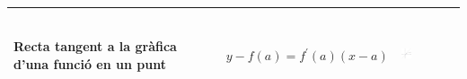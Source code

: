 \documentclass{article}
\begin{document}
\begin{center}
\begin{longtable}{ | l |l|l|}
        \hline
    Recta tangent a la gràfica d'una funció en un punt& $y-f(a)=f^{\prime}(a)(x-a)$& \includegraphics[width=0.2\textwidth, height=25mm]{recta_tangent.png} \\
\hline
	\end{longtable}
\end{center}
\end{document}
